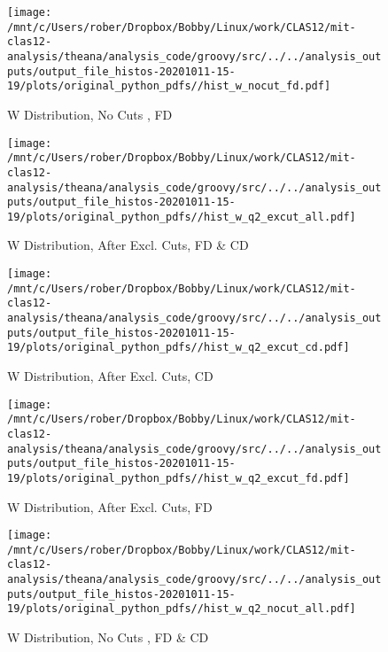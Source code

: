 \documentclass{article}
\begin{document}
\begin{landscape}
    \begin{figure}[h]
        \centering

        \texttt{[image: /mnt/c/Users/rober/Dropbox/Bobby/Linux/work/CLAS12/mit-clas12-analysis/theana/analysis\_code/groovy/src/../../analysis\_outputs/output\_file\_histos-20201011-15-19/plots/original\_python\_pdfs//hist\_w\_nocut\_fd.pdf]}
        \captionsetup{textformat=empty,labelformat=blank}
        \caption{W Distribution, No Cuts , FD}
    \end{figure}
    \clearpage
    
    \begin{figure}[h]
        \centering

        \texttt{[image: /mnt/c/Users/rober/Dropbox/Bobby/Linux/work/CLAS12/mit-clas12-analysis/theana/analysis\_code/groovy/src/../../analysis\_outputs/output\_file\_histos-20201011-15-19/plots/original\_python\_pdfs//hist\_w\_q2\_excut\_all.pdf]}
        \captionsetup{textformat=empty,labelformat=blank}
        \caption{W Distribution, After Excl. Cuts, FD \& CD}
    \end{figure}
    \clearpage
    
    \begin{figure}[h]
        \centering

        \texttt{[image: /mnt/c/Users/rober/Dropbox/Bobby/Linux/work/CLAS12/mit-clas12-analysis/theana/analysis\_code/groovy/src/../../analysis\_outputs/output\_file\_histos-20201011-15-19/plots/original\_python\_pdfs//hist\_w\_q2\_excut\_cd.pdf]}
        \captionsetup{textformat=empty,labelformat=blank}
        \caption{W Distribution, After Excl. Cuts, CD}
    \end{figure}
    \clearpage
    
    \begin{figure}[h]
        \centering

        \texttt{[image: /mnt/c/Users/rober/Dropbox/Bobby/Linux/work/CLAS12/mit-clas12-analysis/theana/analysis\_code/groovy/src/../../analysis\_outputs/output\_file\_histos-20201011-15-19/plots/original\_python\_pdfs//hist\_w\_q2\_excut\_fd.pdf]}
        \captionsetup{textformat=empty,labelformat=blank}
        \caption{W Distribution, After Excl. Cuts, FD}
    \end{figure}
    \clearpage
    
    \begin{figure}[h]
        \centering

        \texttt{[image: /mnt/c/Users/rober/Dropbox/Bobby/Linux/work/CLAS12/mit-clas12-analysis/theana/analysis\_code/groovy/src/../../analysis\_outputs/output\_file\_histos-20201011-15-19/plots/original\_python\_pdfs//hist\_w\_q2\_nocut\_all.pdf]}
        \captionsetup{textformat=empty,labelformat=blank}
        \caption{W Distribution, No Cuts , FD \& CD}
    \end{figure}
    \clearpage
    

\end{landscape}
\end{document}
